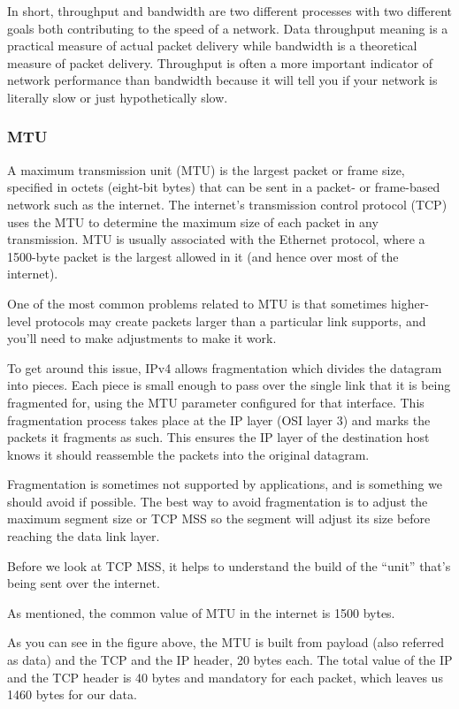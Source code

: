In short, throughput and bandwidth are two different processes with two different goals both contributing to the speed of a network. Data throughput meaning is a practical measure of actual packet delivery while bandwidth is a theoretical measure of packet delivery. Throughput is often a more important indicator of network performance than bandwidth because it will tell you if your network is literally slow or just hypothetically slow.


\subsubsection{MTU}
A maximum transmission unit (MTU) is the largest packet or frame size, specified in octets (eight-bit bytes) that can be sent in a packet- or frame-based network such as the internet. The internet’s transmission control protocol (TCP) uses the MTU to determine the maximum size of each packet in any transmission. MTU is usually associated with the Ethernet protocol, where a 1500-byte packet is the largest allowed in it (and hence over most of the internet).

One of the most common problems related to MTU is that sometimes higher-level protocols may create packets larger than a particular link supports, and you’ll need to make adjustments to make it work.

To get around this issue, IPv4 allows fragmentation which divides the datagram into pieces. Each piece is small enough to pass over the single link that it is being fragmented for, using the MTU parameter configured for that interface. This fragmentation process takes place at the IP layer (OSI layer 3) and marks the packets it fragments as such. This ensures the IP layer of the destination host knows it should reassemble the packets into the original datagram.

Fragmentation is sometimes not supported by applications, and is something we should avoid if possible. The best way to avoid fragmentation is to adjust the maximum segment size or TCP MSS so the segment will adjust its size before reaching the data link layer.

Before we look at TCP MSS, it helps to understand the build of the  “unit” that’s being sent over the internet.


As mentioned, the common value of MTU in the internet is 1500 bytes.

As you can see in the figure above, the MTU is built from payload (also referred as data) and the TCP and the IP header, 20 bytes each. The total value of the IP and the TCP header is 40 bytes and mandatory for each packet, which leaves us 1460 bytes for our data.


